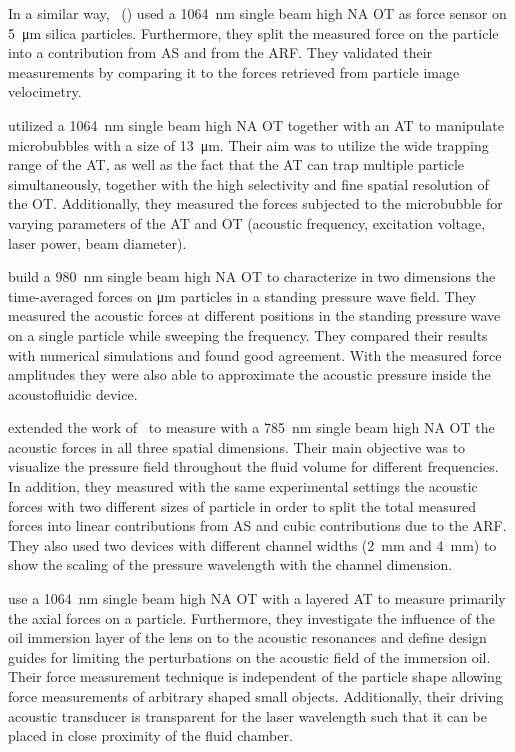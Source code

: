 In a similar way, ~(\citeyear{Bassindale2014}) used a 
\SI{1064}{\nm} single beam high NA OT as force sensor on \SI{5}{\um} silica 
particles. Furthermore, they split the measured force on the particle into a 
contribution from AS and from the ARF. They validated their measurements by 
comparing it to the forces retrieved from particle image velocimetry.

 utilized a \SI{1064}{\nm} single beam high NA OT together with 
an AT to manipulate microbubbles with a size of \SI{13}{\um}. Their aim was to 
utilize the wide trapping range of the AT, as well as the fact that the AT can 
trap multiple particle simultaneously, together with the high selectivity and 
fine spatial resolution of the OT. Additionally, they measured the forces 
subjected to the microbubble for varying parameters of the AT and OT (acoustic 
frequency, excitation voltage, laser power, beam diameter).

 build a \SI{980}{\nm} single beam high NA OT to 
characterize in two dimensions the time-averaged forces on \si{\um} particles 
in a standing pressure wave field. They measured the acoustic forces at 
different positions in the standing pressure wave on a single particle while 
sweeping the frequency. They compared their results with numerical simulations 
and found good agreement. With the measured force amplitudes they were also 
able to approximate the acoustic pressure inside the acoustofluidic device.

 extended the work of~\cite{Lakaemper2015} to measure with 
a \SI{785}{\nm} single beam high NA OT the acoustic forces in all three spatial 
dimensions. Their main objective was to visualize the pressure field throughout 
the fluid volume for different frequencies. In addition, they measured with the 
same experimental settings the acoustic forces with two different sizes of 
particle in order to split the total measured forces into linear contributions 
from AS and cubic contributions due to the ARF. They also used two devices with 
different channel widths (\SI{2}{\mm} and \SI{4}{\mm}) to show the scaling of 
the pressure wavelength with the channel dimension.

 use a \SI{1064}{\nm} single beam high NA OT with a 
layered AT to measure primarily the axial forces on a particle. Furthermore, 
they investigate the influence of the oil immersion layer of the lens on to the 
acoustic resonances and define design guides for limiting the perturbations on 
the acoustic field of the immersion oil. Their force measurement technique is 
independent of the particle shape allowing force measurements of arbitrary 
shaped small objects. Additionally, their driving acoustic transducer is 
transparent for the laser wavelength such that it can be placed in close 
proximity of the fluid chamber.



